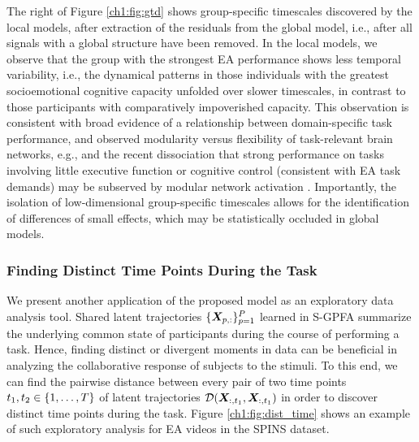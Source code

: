 The right of Figure \ref{ch1:fig:gtd} shows group-specific timescales discovered by the local models, after extraction of the residuals from the global model, i.e., after all signals with a global structure have been removed. In the local models, we observe that the group with the strongest EA performance shows less temporal variability, i.e., the dynamical patterns in those individuals with the greatest socioemotional cognitive capacity unfolded over slower timescales, in contrast to those participants with comparatively impoverished capacity. This observation is consistent with broad evidence of a relationship between domain-specific task performance, and observed modularity versus flexibility of task-relevant brain networks, e.g.\cite{olsen2013functional}, and the recent dissociation that strong performance on tasks involving little executive function or cognitive control (consistent with EA task demands) may be subserved by modular network activation \cite{ramos2017static}. Importantly, the isolation of low-dimensional group-specific timescales allows for the identification of differences of small effects, which may be statistically occluded in global models. 


\subsubsection{Finding Distinct Time Points During the Task}
We present another application of the proposed model as an exploratory data analysis tool. Shared latent trajectories $\{\bm{X}_{p, :}\}_{p=1}^P$ learned in S-GPFA summarize the underlying common state of participants during the course of performing a task. Hence, finding distinct or divergent moments in data can be beneficial in analyzing the collaborative response of subjects to the stimuli. To this end, we can find the pairwise distance between every pair of two time points $t_1, t_2 \in \{1, \ldots, T\}$ of latent trajectories $\mathcal{D}(\bm{X}_{:, t_1}, \bm{X}_{:, t_1})$ in order to discover distinct time points during the task. Figure \ref{ch1:fig:dist_time} shows an example of such exploratory analysis for EA videos in the SPINS dataset.  

